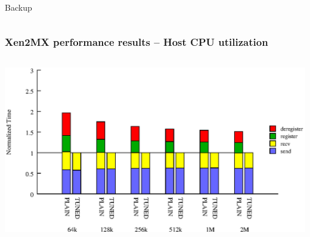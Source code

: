 \documentclass[red,slidestop,notes,compress,mathserif]{beamer}
\begin{document}
\begin{frame}
\frametitle{}
                \vfill%
\begin{columns}
        \begin{center}
                \vfill%
        \end{center}
\end{columns}
                \vfill%
\end{frame}

\begin{frame}
\frametitle{}
                \vfill%
\begin{columns}
        \begin{center}
        \begin{center}
                        {\LARGE Backup}
        \end{center}
                \vfill%
        \end{center}
\end{columns}
                \vfill%
\end{frame}

\begin{frame}
\frametitle{Xen2MX performance results -- Host CPU utilization}
\begin{columns}
\includegraphics[width=\textwidth]{figs/bare/lat_breakdown_dom0.eps}
\end{columns}
\end{frame}
\end{document}
